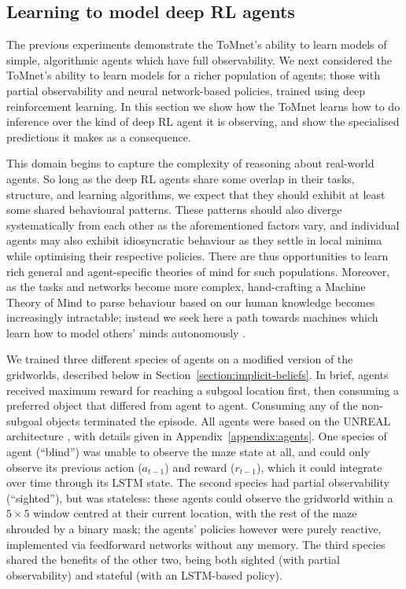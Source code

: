 \documentclass{article}
\begin{document}

\subsection{Learning to model deep RL agents}
\label{section:trained-agents}

The previous experiments demonstrate the ToMnet's ability to learn models of simple, algorithmic agents which have full observability. We next considered the ToMnet's ability to learn models for a richer population of agents: those with partial observability and neural network-based policies, trained using deep reinforcement learning. In this section we show how the ToMnet learns how to do inference over the kind of deep RL agent it is observing, and show the specialised predictions it makes as a consequence.

This domain begins to capture the complexity of reasoning about real-world agents. So long as the deep RL agents share some overlap in their tasks, structure, and learning algorithms, we expect that they should exhibit at least some shared behavioural patterns. These patterns should also diverge systematically from each other as the aforementioned factors vary, and individual agents may also exhibit idiosyncratic behaviour as they settle in local minima while optimising their respective policies. There are thus opportunities to learn rich general and agent-specific theories of mind for such populations. Moreover, as the tasks and networks become more complex, hand-crafting a Machine Theory of Mind to parse behaviour based on our human knowledge \citep[e.g.\ ][]{baker2011bayesian, nakahashi2016modeling, Baker2017, lake2017building} becomes increasingly intractable; instead we seek here a path towards machines which learn how to model others' minds autonomously \cite{botvinick2017building}.

We trained three different species of agents on a modified version of the gridworlds, described below in Section~\ref{section:implicit-beliefs}. In brief, agents received maximum reward for reaching a subgoal location first, then consuming a preferred object that differed from agent to agent. Consuming any of the non-subgoal objects terminated the episode. All agents were based on the UNREAL architecture \cite{jaderberg2017reinforcement}, with details given in Appendix~\ref{appendix:agents}. One species of agent (``blind'') was unable to observe the maze state at all, and could only observe its previous action ($a_{t-1}$) and reward ($r_{t-1}$), which it could integrate over time through its LSTM state. The second species had partial observability (``sighted''), but was stateless: these agents could observe the gridworld within a $5\times5$ window centred at their current location, with the rest of the maze shrouded by a binary mask; the agents' policies however were purely reactive, implemented via feedforward networks without any memory. The third species shared the benefits of the other two, being both sighted (with partial observability) and stateful (with an LSTM-based policy).
\end{document}

